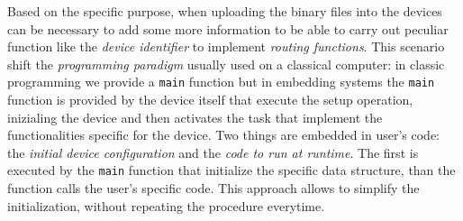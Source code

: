 \documentclass[10pt,a4paper]{report}
\theoremstyle{definition}
\begin{document}
Based on the specific purpose, when uploading the binary files into the devices can be necessary to add some more information to be able to carry out peculiar function like the \textit{device identifier} to implement \textit{routing functions}.
This scenario shift the \textit{programming paradigm} usually used on a classical computer: in classic programming we provide a \texttt{main} function but in embedding systems the \texttt{main} function is provided by the device itself that execute the setup operation, inizialing the device and then activates the task that implement the functionalities specific for the device. Two things are embedded in user's code: the \textit{initial device configuration} and the \textit{code to run at runtime}. The first is executed by the \texttt{main} function that initialize the specific data structure, than the function calls the user's specific code.
This approach allows to simplify the initialization, without repeating the procedure everytime.
\end{document}
